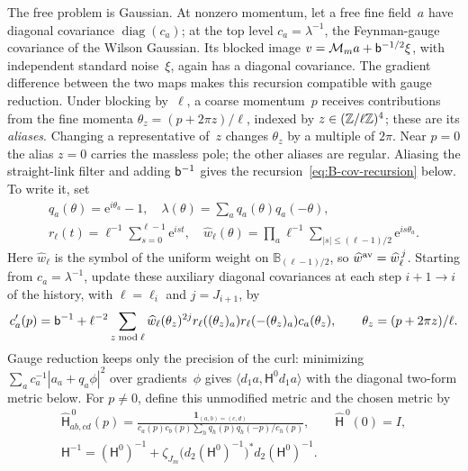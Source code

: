 The free problem is Gaussian. At nonzero momentum, let a free fine field~$a$ have diagonal covariance $\operatorname{diag}(c_a)$; at the top level $c_a=\lambda^{-1}$, the Feynman-gauge covariance of the Wilson Gaussian. Its blocked image $v=\mathcal M_ma+\mathsf{b}^{-1/2}\xi$, with independent standard noise~$\xi$, again has a diagonal covariance. The gradient difference between the two maps makes this recursion compatible with gauge reduction. Under blocking by~$\ell$, a coarse momentum~$p$ receives contributions from the fine momenta $\theta_z=(p+2\pi z)/\ell$, indexed by $z\in(\mathbb{Z}/\ell\mathbb{Z})^4$; these are its \emph{aliases}. Changing a representative of~$z$ changes $\theta_z$ by a multiple of $2\pi$. Near $p=0$ the alias $z=0$ carries the massless pole; the other aliases are regular. Aliasing the straight-link filter and adding $\mathsf{b}^{-1}$ gives the recursion~\eqref{eq:B-cov-recursion} below. To write it, set
\begin{gather*}
q_a(\theta)=\mathrm e^{i\theta_a}-1,\quad \lambda(\theta)=\sum_aq_a(\theta)q_a(-\theta),\\
r_\ell(t)=\ell^{-1}\sum_{s=0}^{\ell-1}\mathrm e^{ist},\quad
\widehat w_\ell(\theta)=\prod_a \ell^{-1}\sum_{|s|\le(\ell-1)/2}\mathrm e^{is\theta_a}.
\end{gather*}
Here $\widehat w_\ell$ is the symbol of the uniform weight on $\mathbb B_{(\ell-1)/2}$, so $\widehat w^{\rm av}=\widehat w_\ell^{\,j}$. Starting from $c_a=\lambda^{-1}$, update these auxiliary diagonal covariances at each step $i+1\to i$ of the history, with $\ell=\ell_i$ and $j=J_{i+1}$, by
\begin{equation}\label{eq:B-cov-recursion}
c'_a(p)=\mathsf{b}^{-1}+\ell^{-2}\sum_{z\bmod \ell}\widehat w_\ell(\theta_z)^{2j}r_\ell((\theta_z)_a)r_\ell(-(\theta_z)_a)c_a(\theta_z),\qquad \theta_z=(p+2\pi z)/\ell.
\end{equation}
Gauge reduction keeps only the precision of the curl: minimizing $\sum_ac_a^{-1}|a_a+q_a\phi|^2$ over gradients~$\phi$ gives $\langle d_1a,\mathsf H^0d_1a\rangle$ with the diagonal two-form metric below. For $p\ne0$, define this unmodified metric and the chosen metric by
\begin{gather*}
\widehat{\mathsf H}^{\,0}_{ab,cd}(p)=
\frac{\mathbf1_{(a,b)=(c,d)}}{c_a(p)c_b(p)\sum_hq_h(p)q_h(-p)/c_h(p)},\qquad
\widehat{\mathsf H}^{\,0}(0)=I,\\
\mathsf H^{-1}=(\mathsf H^0)^{-1}
 +\zeta_{J_m}\bigl(d_2(\mathsf H^0)^{-1}\bigr)^*d_2(\mathsf H^0)^{-1}.
\end{gather*}
